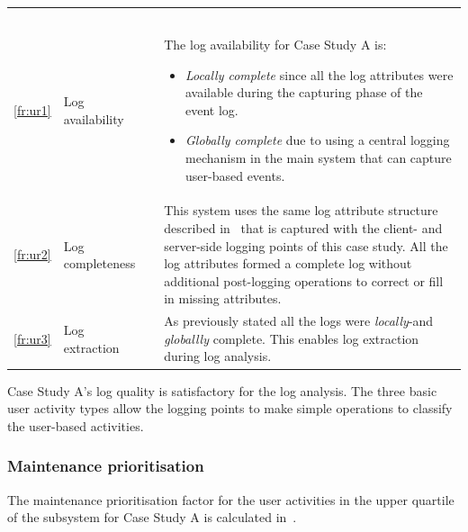 \begin{xltabular}{\textwidth}{clcX}
	\caption[Logging quality assessment of Case Study A]{\textit{Logging quality assessment of the test system}}\label{tbl:ch3_caseAQuality}\\
	\toprule
	 &  &  &  \\
	\midrule
	\endfirsthead

	\caption[]{\continueCaption} \\
	\toprule
	 &  &  &  \\
	\midrule
	\endhead

	\midrule
	 \\ 
	\endfoot
	\endlastfoot

	\ref{fr:ur1} & Log availability & \cmark & \RaggedRight The log availability for Case Study A is:
		\begin{itemize}
			\item \textit{Locally complete} since all the log attributes were available during the capturing phase of the event log. 
			\item \textit{Globally complete} due to using a central logging mechanism in the main system that can capture user-based events.  
		\end{itemize} \\
	\ref{fr:ur2} & Log completeness & \cmark & This system uses the same log attribute structure described in~ that is captured with the client- and server-side logging points of this case study. All the log attributes formed a complete log without additional post-logging operations to correct or fill in missing attributes. \\
	\ref{fr:ur3} & Log extraction & \cmark & As previously stated all the logs were \textit{locally}-and \textit{globallly} complete. This enables log extraction during log analysis. \\
	\bottomrule
\end{xltabular}

Case Study A's log quality is satisfactory for the log analysis. The three basic user activity types allow the logging points to make simple operations to classify the user-based activities. 

\clearpage

\subsubsection{Maintenance prioritisation}
The maintenance prioritisation factor for the user activities in the upper quartile of the subsystem for Case Study A is calculated in~.

